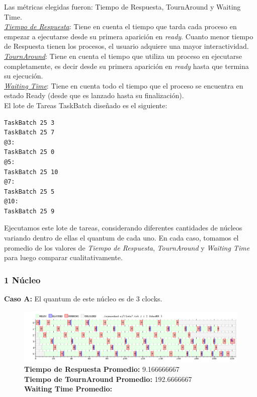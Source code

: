 \documentclass[a4paper]{article}
\begin{document}
Las m\'etricas elegidas fueron: Tiempo de Respuesta, TournAround y Waiting Time.\\

\underline{\emph{Tiempo de Respuesta}}: Tiene en cuenta el tiempo que tarda cada proceso en empezar a ejecutarse desde su primera aparici\'on en \textit{ready}. Cuanto menor tiempo de Respuesta tienen los procesos, el usuario adquiere una mayor interactividad.\\

\underline{\emph{TournAround}}: Tiene en cuenta el tiempo que utiliza un proceso en ejecutarse completamente, es decir desde su primera aparici\'on en \textit{ready} hasta que termina su ejecuci\'on.\\

\underline{\emph{Waiting Time}}: Tiene en cuenta todo el tiempo que el proceso se encuentra en estado Ready (desde que es lanzado hasta su finalizaci\'on).\\


El lote de Tareas TaskBatch dise\~nado es el siguiente:
	\begin{codesnippet}
	\begin{verbatim}
TaskBatch 25 3
TaskBatch 25 7
@3:
TaskBatch 25 0
@5:
TaskBatch 25 10
@7:
TaskBatch 25 5
@10:
TaskBatch 25 9
	\end{verbatim}
	\end{codesnippet}
\newpage	
	Ejecutamos este lote de tareas, considerando diferentes cantidades de n\'ucleos variando dentro de ellas el quantum de cada uno. En cada caso, tomamos el promedio de los valores de \textit{Tiempo de Respuesta}, \textit{TournAround} y \textit{Waiting Time} para luego comparar cualitativamente.
	
	\subsubsection*{1 N\'ucleo}
	
	\textbf{Caso A:} El quantum de este n\'ucleo es de 3 clocks.
	
	 \begin{figure}[h!]
   \begin{center}
 	\includegraphics[scale=0.5]{imagenes/ej7/1nucleoA.png}
 	\textbf{Tiempo de Respuesta Promedio:} 9.166666667\\
 	\textbf{Tiempo de TournAround Promedio:} 192.6666667\\
 	\textbf{Waiting Time Promedio:} \\
   \end{center}
 \end{figure} 
	
\end{document}
